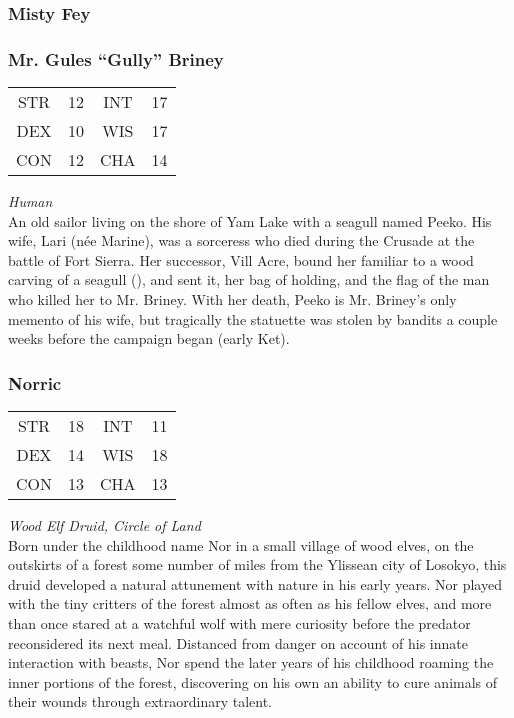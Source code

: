\subsubsection{Misty Fey}
\label{people:mistyfey}

\subsubsection{Mr. Gules ``Gully'' Briney}
\label{people:mrbriney}
\begin{center}
\begin{tabular}{c c|c c}
STR & 12 & INT & 17\\
DEX & 10 & WIS & 17 \\
CON & 12 & CHA & 14 \end{tabular}\end{center}
\textit{Human}\\
An old sailor living on the shore of Yam Lake with a seagull named Peeko. His wife, Lari (n\'ee Marine), was a sorceress who died during the Crusade at the battle of Fort Sierra. Her successor, Vill Acre, bound her familiar to a wood carving of a seagull (), and sent it, her bag of holding, and the flag of the man who killed her to Mr. Briney. With her death, Peeko is Mr. Briney's only memento of his wife, but tragically the statuette was stolen by bandits a couple weeks before the campaign began (early Ket). 


\subsubsection{Norric}
\label{people:jeff}
\begin{center}
\begin{tabular}{c c|c c}
STR & 18 & INT & 11\\
DEX & 14 & WIS & 18 \\
CON & 13 & CHA & 13 \end{tabular}\end{center}
\textit{Wood Elf Druid, Circle of Land}\\

Born under the childhood name Nor in a small village of wood elves, on the outskirts of a forest some number of miles from the Ylissean city of Losokyo, this druid developed a natural attunement with nature in his early years. Nor played with the tiny critters of the forest almost as often as his fellow elves, and more than once stared at a watchful wolf with mere curiosity before the predator reconsidered its next meal. Distanced from danger on account of his innate interaction with beasts, Nor spend the later years of his childhood roaming the inner portions of the forest, discovering on his own an ability to cure animals of their wounds through extraordinary talent. 

